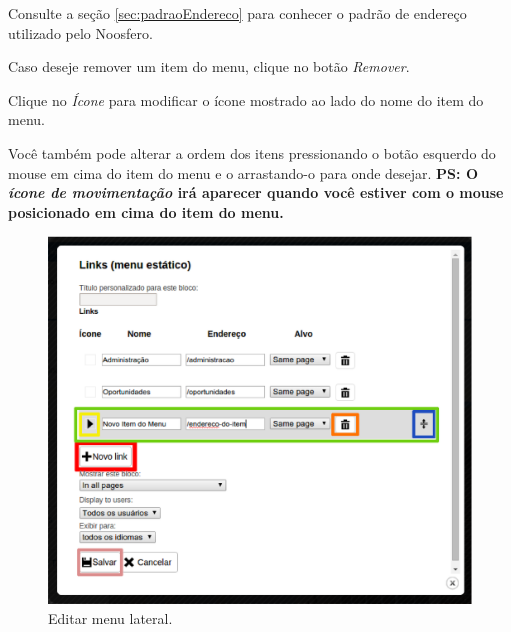Consulte a seção \ref{sec:padraoEndereco} para conhecer o padrão de endereço utilizado pelo Noosfero.

Caso deseje remover um item do menu, clique no botão \emph{\color{orange}Remover}.

Clique no \emph{\color{yellow}Ícone} para modificar o ícone mostrado ao lado do nome do item do menu.

Você também pode alterar a ordem dos itens pressionando o botão esquerdo do mouse em cima do item do menu e o arrastando-o para onde desejar. 
\textbf{PS: O \emph{\color{blue}ícone de movimentação} irá aparecer quando você estiver com o mouse posicionado em cima do item do menu.}

\begin{figure}[h]
     \centering
       \includegraphics[keepaspectratio=true,scale=0.4]{figuras/editarMenuLateral.eps}
     \caption{Editar menu lateral.}
     \label{fig:editarMenuLateral}
\end{figure}
